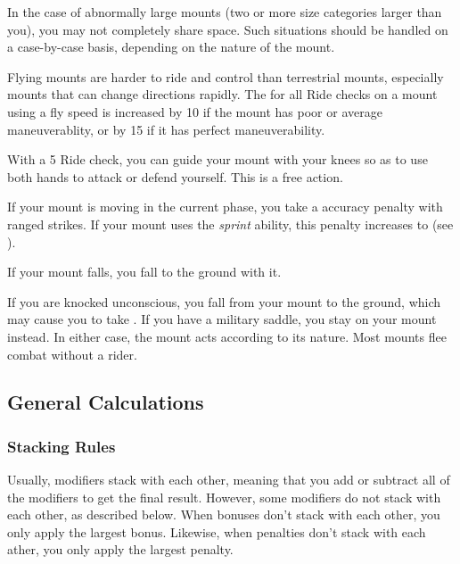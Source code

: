             In the case of abnormally large mounts (two or more size categories larger than you), you may not completely share space. Such situations should be handled on a case-by-case basis, depending on the nature of the mount.

             Flying mounts are harder to ride and control than terrestrial mounts, especially mounts that can change directions rapidly.
            The  for all Ride checks on a mount using a fly speed is increased by 10 if the mount has poor or average maneuverablity, or by 15 if it has perfect maneuverability.

             With a  5 Ride check, you can guide your mount with your knees so as to use both hands to attack or defend yourself. This is a free action.

            If your mount is moving in the current phase, you take a  accuracy penalty with ranged strikes.
            If your mount uses the \textit{sprint} ability, this penalty increases to  (see ).

             If your mount falls, you fall to the ground with it.

             If you are knocked unconscious, you fall from your mount to the ground, which may cause you to take .
            If you have a military saddle, you stay on your mount instead.
            In either case, the mount acts according to its nature.
            Most mounts flee combat without a rider.

    \subsection{General Calculations}

        \subsubsection{Stacking Rules}\label{Stacking Rules}
            Usually, modifiers stack with each other, meaning that you add or subtract all of the modifiers to get the final result.
            However, some modifiers do not stack with each other, as described below.
            When bonuses don't stack with each other, you only apply the largest bonus.
            Likewise, when penalties don't stack with each ather, you only apply the largest penalty.

